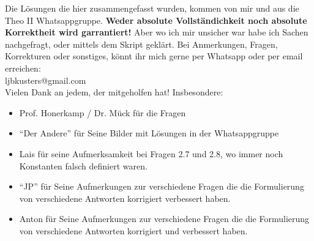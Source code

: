 \author{Luc Kusters}
\date{WS 19/20}
\maketitle

\noindent
Die Lösungen die hier zusammengefasst wurden, kommen von mir und
aus die Theo II Whatsappgruppe. 
\textbf{Weder absolute Vollständichkeit noch absolute Korrektheit wird garrantiert!} Aber wo ich mir unsicher war habe ich Sachen nachgefragt, oder 
mittels dem Skript geklärt.
Bei Anmerkungen, Fragen, Korrekturen oder sonstiges, könnt ihr mich gerne 
per Whatsapp oder per email erreichen:\\ 
ljbkusters@gmail.com \\

\noindent
Vielen Dank an jedem, der mitgeholfen hat! Insbesondere:
\begin{itemize}
  \item Prof. Honerkamp / Dr. Mück für die Fragen
  \item ``Der Andere'' für Seine Bilder mit Lösungen in der Whatsappgruppe
  \item Lais für seine Aufmerksamkeit bei Fragen 2.7 und 2.8, wo immer noch Konstanten falsch definiert waren.
  \item ``JP'' für Seine Aufmerkungen zur verschiedene Fragen die die 
    Formulierung von verschiedene Antworten korrigiert verbessert haben.
  \item Anton für Seine Aufmerkungen zur verschiedene Fragen die die 
    Formulierung von verschiedene Antworten korrigiert und verbessert haben.
\end{itemize}

